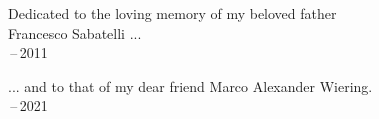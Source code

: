 
\thispagestyle{empty}



\vspace*{3cm}

\begin{center}
Dedicated to the loving memory of my beloved father \\ \smallskip Francesco Sabatelli ... \\ \,--\,2011
\end{center}

\vspace*{3cm}

\begin{center}
... and to that of my dear friend Marco Alexander Wiering. \\ \,--\,2021
\end{center}

